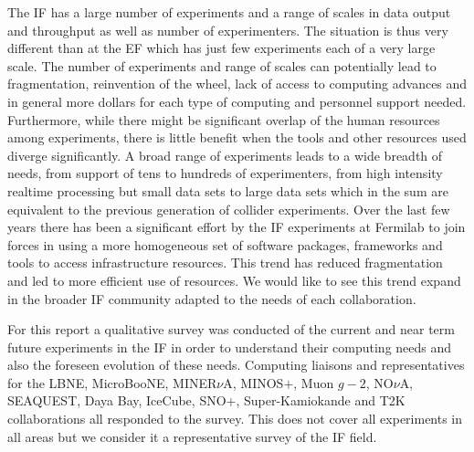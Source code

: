 The IF has a large number of experiments and a range of scales in data output
and throughput as well as number of experimenters. The situation is thus very
different than at the EF which has just few experiments each of a very large
scale. The number of experiments and range of scales can potentially lead to
fragmentation, reinvention of the wheel, lack of access to computing advances
and in general more dollars for each type of computing and personnel support
needed. Furthermore, while there might be significant overlap of the human
resources among experiments, there is little benefit when the tools and other
resources used diverge significantly. A broad range of experiments leads to a
wide breadth of needs, from support of tens to hundreds of experimenters, from
high intensity realtime processing but small data sets to large data sets
which in the sum are equivalent to the previous generation of collider
experiments. Over the last few years there has been a significant effort by
the IF experiments at Fermilab to join forces in using a more homogeneous set
of software packages, frameworks and tools to access infrastructure resources.
This trend has reduced fragmentation and led to more efficient use of
resources. We would like to see this trend expand in the broader IF community
adapted to the needs of each collaboration.

For this report a qualitative survey was conducted of the current and near term future experiments in the IF in order to understand their computing needs and also the foreseen evolution of these needs.  Computing liaisons and representatives for the LBNE, MicroBooNE, MINER$\nu$A, MINOS$+$, Muon $g-2$, NO$\nu$A, SEAQUEST,  Daya Bay, IceCube, SNO+, Super-Kamiokande and T2K collaborations all responded to the survey. This does not cover all experiments in all areas but we consider it a representative survey of the IF  field.

